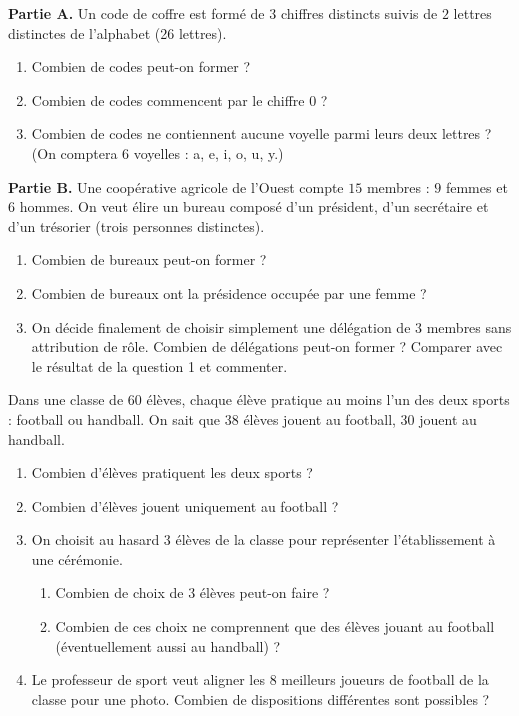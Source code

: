 \documentclass[11pt]{article}
\newcounter{popsec}
\newcounter{popsub}
\newcommand{\courssub}[1]{%
  \stepcounter{popsub}%
  \par\vspace{9pt}\noindent{\popxbold\fontsize{11.5}{13}\selectfont\color{popink}{\color{poporange}\thepopsec.\thepopsub}\hspace{6pt}#1}\par\nopagebreak\vspace{4pt}
}
\begin{document}
\courssub{Je me prépare au Probatoire}

\begin{exercice}
\textbf{Partie A.} Un code de coffre est formé de $3$ chiffres distincts suivis de $2$ lettres distinctes de l'alphabet (26 lettres).
\begin{enumerate}
\item Combien de codes peut-on former ?
\item Combien de codes commencent par le chiffre $0$ ?
\item Combien de codes ne contiennent aucune voyelle parmi leurs deux lettres ? (On comptera $6$ voyelles : a, e, i, o, u, y.)
\end{enumerate}
\textbf{Partie B.} Une coopérative agricole de l'Ouest compte $15$ membres : $9$ femmes et $6$ hommes. On veut élire un bureau composé d'un président, d'un secrétaire et d'un trésorier (trois personnes distinctes).
\begin{enumerate}
\item Combien de bureaux peut-on former ?
\item Combien de bureaux ont la présidence occupée par une femme ?
\item On décide finalement de choisir simplement une délégation de $3$ membres sans attribution de rôle. Combien de délégations peut-on former ? Comparer avec le résultat de la question 1 et commenter.
\end{enumerate}
\end{exercice}

\begin{exercice}
Dans une classe de $60$ élèves, chaque élève pratique au moins l'un des deux sports : football ou handball. On sait que $38$ élèves jouent au football, $30$ jouent au handball.
\begin{enumerate}
\item Combien d'élèves pratiquent les deux sports ?
\item Combien d'élèves jouent uniquement au football ?
\item On choisit au hasard $3$ élèves de la classe pour représenter l'établissement à une cérémonie.
\begin{enumerate}
\item Combien de choix de $3$ élèves peut-on faire ?
\item Combien de ces choix ne comprennent que des élèves jouant au football (éventuellement aussi au handball) ?
\end{enumerate}
\item Le professeur de sport veut aligner les $8$ meilleurs joueurs de football de la classe pour une photo. Combien de dispositions différentes sont possibles ?
\end{enumerate}
\end{exercice}
\end{document}
